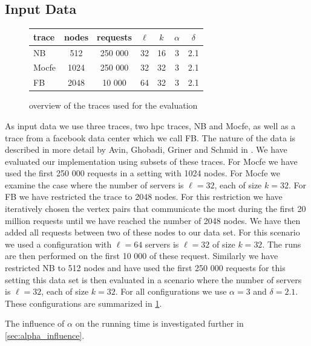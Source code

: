 \documentclass[a4paper,UKenglish,cleveref, autoref, thm-restate,authorcolumns]{lipics-v2019}
\newcommand{\fb}{FB}
\newcommand{\dbmocfe}{Mocfe}
\newcommand{\dbnekbone}{NB}
\begin{document}
\subsection{Input Data}
\label{inputDesc}

\begin{figure}
	\begin{center}
		\begin{tabular}{|l|c|c|c|c|c|c|}
			\hline
			trace & nodes & requests & $\ell$ & $k$ & $\alpha$ & $\delta$\\
			\hline
			\dbnekbone{} & 512 & 250 000 & 32 & 16 & 3 & 2.1 \\
			\dbmocfe{} & 1024 & 250 000 & 32 & 32 & 3 & 2.1 \\
			\fb{} & 2048 & 10 000 & 64 & 32 & 3 & 2.1 \\
			\hline
		\end{tabular}
	\end{center}
	\caption{overview of the traces used for the evaluation}
	\label{fig:trace_overview}
\end{figure}

As input data we use three traces, two hpc traces, \dbnekbone{} and \dbmocfe{}, as well as a trace from a facebook data center which we call \fb{}.
 The nature of the data is described in more detail by Avin, Ghobadi, Griner and Schmid in \cite{Avin2019}.
We have evaluated our implementation using subsets of these traces. For \dbmocfe{} we have used the first 250 000 requests in a setting with 1024 nodes. 
For \dbmocfe{} we examine the case where the number of servers is $\ell=32$, each of size $k=32$.
For \fb{} we have restricted the trace to 2048 nodes. For this restriction we have iteratively chosen the vertex pairs that communicate the most during the first 20 million requests 
until we have reached the number of 2048 nodes. We have then added all requests between two of these nodes to our data set. For this scenario we used a configuration with $\ell=64$ 
servers is $\ell=32$ of size $k=32$.
The runs are then performed on the first 10 000 of these request. Similarly we have restricted \dbnekbone{} to 512 nodes and have used the first 250 000 requests for this setting 
this data set is then evaluated in a scenario where the number of servers is $\ell=32$, each of size $k=32$.
For all configurations we use $\alpha=3$ and $\delta=2.1$.
These configurations are summarized in \cref{fig:trace_overview}.

The influence of $\alpha$ on the running time is investigated further in \cref{sec:alpha_influence}.
\end{document}
